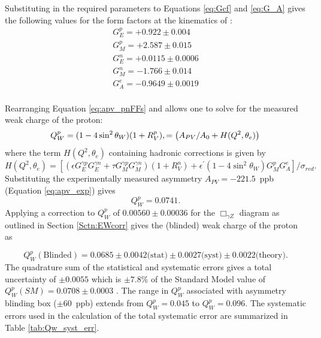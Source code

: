 Substituting in the required parameters to Equations \ref{eq:Gcf} and \ref{eq:G_A} gives the following values for the form factors at the kinematics of \Q:
\begin{align*}
G_E^p = +0.922\pm 0.004\\
G_M^p = +2.587\pm 0.015\\
G_E^n = +0.0115\pm 0.0006\\
G_M^n = -1.766\pm 0.014\\
G_A^e = -0.9649\pm 0.0019\\
\end{align*}

Rearranging Equation \ref{eq:apv_pnFFs} and allows one to solve for the measured weak charge of the proton:
\begin{equation}
Q_W^p=(1-4\sin^2\theta_W)(1+R_V^p),=\left(A_{PV}/A_0+H(Q^2,\theta_e)\right)\\
\end{equation}
where the term $H(Q^2,\theta_e)$ containing hadronic corrections is given by
\begin{equation}
H(Q^2,\theta_e)=\left[\left(\epsilon G_E^{\gamma p}G_E^{\gamma n}+\tau G_M^{\gamma p}G_M^{\gamma n}\right)(1+R_V^n)+\epsilon^{\prime}(1-4\sin^2\theta_W)G_M^pG_A^e\right]/\sigma_{red}.
\end{equation} 
Substituting the experimentally measured asymmetry $A_{PV}=-221.5$~ppb (Equation \ref{eq:apv_exp}) gives
\[
Q_W^p=0.0741.
\]
Applying a correction to $Q_W^p$ of $0.00560\pm0.00036$ for the $\Box_{\gamma Z}$ diagram as outlined in Section \ref{Sctn:EWcorr} gives the (blinded) weak charge of the proton as

\begin{equation}
Q_W^p(\text{Blinded})=0.0685\pm0.0042\text{(stat)}\pm0.0027\text{(syst)}\pm0.0022\text{(theory)}.
\end{equation}
The quadrature sum of the statistical and systematic errors gives a total uncertainty of $\pm 0.0055$ which is $\pm 7.8\%$ of the Standard Model value of $Q_W^p(SM)=0.0708\pm0.0003$ \cite{PDG2014}. The range in $Q_W^p$ associated with asymmetry blinding box ($\pm60$~ppb) extends from $Q_W^p=0.045$ to $Q_W^p=0.096$. The systematic errors used in the calculation of the total systematic error are summarized in Table \ref{tab:Qw_syst_err}. 

